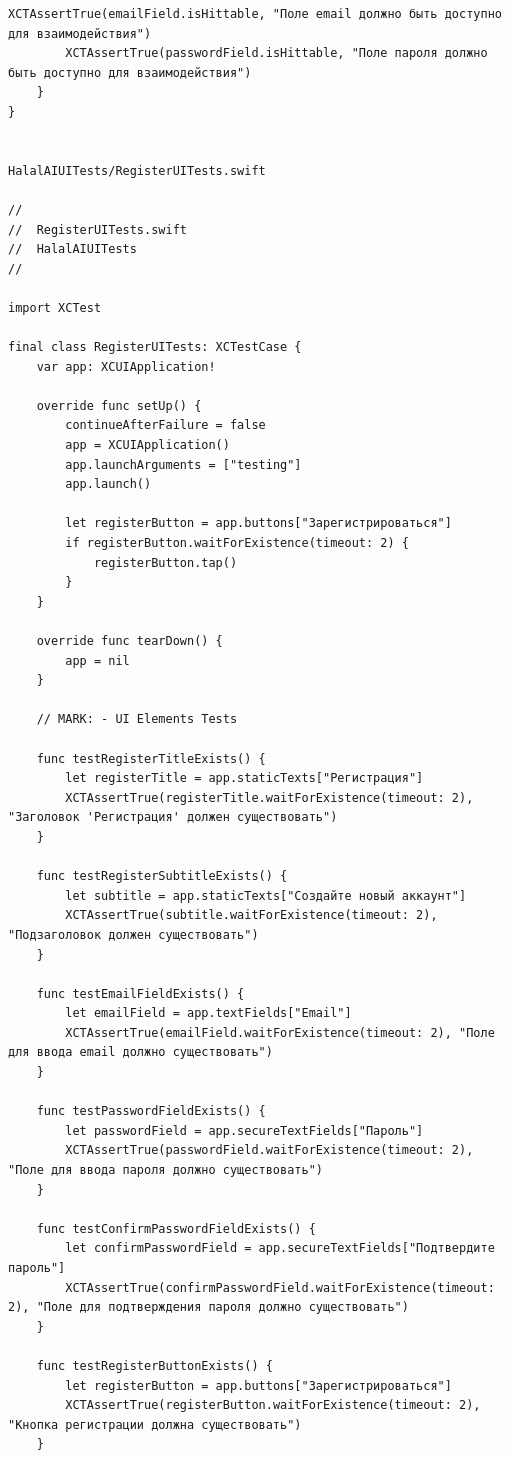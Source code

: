 \begin{lstlisting}[basicstyle=\tiny\ttfamily,breaklines=true]
        XCTAssertTrue(emailField.isHittable, "Поле email должно быть доступно для взаимодействия")
        XCTAssertTrue(passwordField.isHittable, "Поле пароля должно быть доступно для взаимодействия")
    }
}


HalalAIUITests/RegisterUITests.swift

//
//  RegisterUITests.swift
//  HalalAIUITests
//

import XCTest

final class RegisterUITests: XCTestCase {
    var app: XCUIApplication!

    override func setUp() {
        continueAfterFailure = false
        app = XCUIApplication()
        app.launchArguments = ["testing"]
        app.launch()

        let registerButton = app.buttons["Зарегистрироваться"]
        if registerButton.waitForExistence(timeout: 2) {
            registerButton.tap()
        }
    }

    override func tearDown() {
        app = nil
    }

    // MARK: - UI Elements Tests

    func testRegisterTitleExists() {
        let registerTitle = app.staticTexts["Регистрация"]
        XCTAssertTrue(registerTitle.waitForExistence(timeout: 2), "Заголовок 'Регистрация' должен существовать")
    }

    func testRegisterSubtitleExists() {
        let subtitle = app.staticTexts["Создайте новый аккаунт"]
        XCTAssertTrue(subtitle.waitForExistence(timeout: 2), "Подзаголовок должен существовать")
    }

    func testEmailFieldExists() {
        let emailField = app.textFields["Email"]
        XCTAssertTrue(emailField.waitForExistence(timeout: 2), "Поле для ввода email должно существовать")
    }

    func testPasswordFieldExists() {
        let passwordField = app.secureTextFields["Пароль"]
        XCTAssertTrue(passwordField.waitForExistence(timeout: 2), "Поле для ввода пароля должно существовать")
    }

    func testConfirmPasswordFieldExists() {
        let confirmPasswordField = app.secureTextFields["Подтвердите пароль"]
        XCTAssertTrue(confirmPasswordField.waitForExistence(timeout: 2), "Поле для подтверждения пароля должно существовать")
    }

    func testRegisterButtonExists() {
        let registerButton = app.buttons["Зарегистрироваться"]
        XCTAssertTrue(registerButton.waitForExistence(timeout: 2), "Кнопка регистрации должна существовать")
    }


\end{lstlisting}

